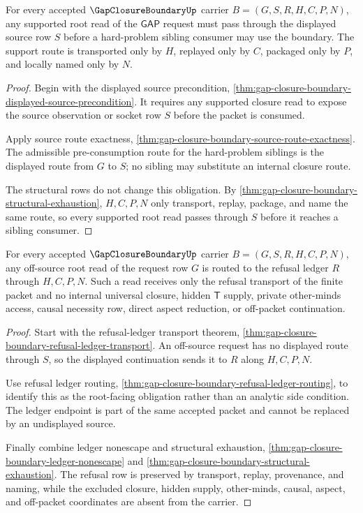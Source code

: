 \begin{theorem}
\label{thm:gap-closure-boundary-source-route-obligation}
For every accepted $\GapClosureBoundaryUp$ carrier $B=(G,S,R,H,C,P,N)$, any supported root read of the $\mathsf{GAP}$ request must pass through the displayed source row $S$ before a hard-problem sibling consumer may use the boundary. The support route is transported only by $H$, replayed only by $C$, packaged only by $P$, and locally named only by $N$.
\end{theorem}
\begin{proof}
Begin with the displayed source precondition, \autoref{thm:gap-closure-boundary-displayed-source-precondition}. It requires any supported closure read to expose the source observation or socket row $S$ before the packet is consumed.

Apply source route exactness, \autoref{thm:gap-closure-boundary-source-route-exactness}. The admissible pre-consumption route for the hard-problem siblings is the displayed route from $G$ to $S$; no sibling may substitute an internal closure route.

The structural rows do not change this obligation. By \autoref{thm:gap-closure-boundary-structural-exhaustion}, $H,C,P,N$ only transport, replay, package, and name the same route, so every supported root read passes through $S$ before it reaches a sibling consumer.
\end{proof}

\begin{theorem}
\label{thm:gap-closure-boundary-refusal-ledger-obligation}
For every accepted $\GapClosureBoundaryUp$ carrier $B=(G,S,R,H,C,P,N)$, any off-source root read of the request row $G$ is routed to the refusal ledger $R$ through $H,C,P,N$. Such a read receives only the refusal transport of the finite packet and no internal universal closure, hidden $\mathsf{T}$ supply, private other-minds access, causal necessity row, direct aspect reduction, or off-packet continuation.
\end{theorem}
\begin{proof}
Start with the refusal-ledger transport theorem, \autoref{thm:gap-closure-boundary-refusal-ledger-transport}. An off-source request has no displayed route through $S$, so the displayed continuation sends it to $R$ along $H,C,P,N$.

Use refusal ledger routing, \autoref{thm:gap-closure-boundary-refusal-ledger-routing}, to identify this as the root-facing obligation rather than an analytic side condition. The ledger endpoint is part of the same accepted packet and cannot be replaced by an undisplayed source.

Finally combine ledger nonescape and structural exhaustion, \autoref{thm:gap-closure-boundary-ledger-nonescape} and \autoref{thm:gap-closure-boundary-structural-exhaustion}. The refusal row is preserved by transport, replay, provenance, and naming, while the excluded closure, hidden supply, other-minds, causal, aspect, and off-packet coordinates are absent from the carrier.
\end{proof}

